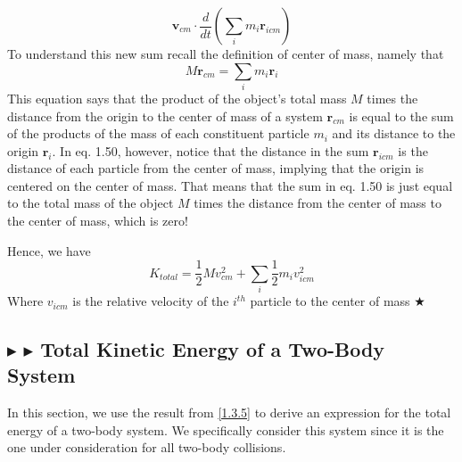 \begin{equation}
    \mathbf{v}_{cm} \cdot \frac{d}{dt}\left(\sum_i m_i \mathbf{r}_{icm}\right)
\end{equation}
\noindent To understand this new sum recall the definition of center of mass, namely that
\begin{equation*}
    M\mathbf{r}_{cm} = \sum_i m_i\mathbf{r}_i
\end{equation*}
\noindent This equation says that the product of the object's total mass $M$ times the distance from the origin to the center of mass of a system $\mathbf{r}_{cm}$ is equal to the sum of the products of the mass of each constituent particle $m_i$ and its distance to the origin $\mathbf{r}_{i}$. In eq. 1.50, however, notice that the distance in the sum $\mathbf{r}_{icm}$ is the distance of each particle from the center of mass, implying that the origin is centered on the center of mass. That means that the sum in eq. 1.50 is just equal to the total mass of the object $M$ times the distance from the center of mass to the center of mass, which is zero!

\noindent Hence, we have
\begin{equation*}
    K_{total} = \frac12 M v_{cm}^2 + \sum_i \frac12 m_i v_{icm}^2
\end{equation*}
\noindent Where $v_{icm}$ is the relative velocity of the $i^{th}$ particle to the center of mass $\bigstar$

\subsection{\color{Goldenrod} $\blacktriangleright$ \color{Orchid} $\blacktriangleright$ \color{black} Total Kinetic Energy of a Two-Body System} \label{1.3.6}
In this section, we use the result from \ref{1.3.5} to derive an expression for the total energy of a two-body system. We specifically consider this system since it is the one under consideration for all two-body collisions.

